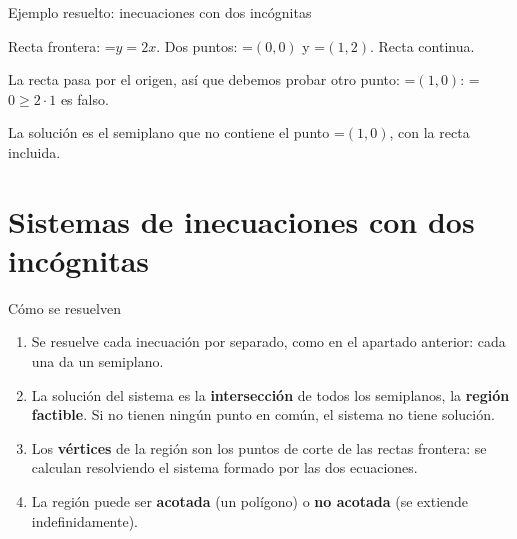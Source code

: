 \documentclass[11pt,a4paper]{article}
\newcommand{\fmm}[1]{\setbox0=\hbox{$#1$}\ifdim\wd0>\linewidth\fmdisp{#1}\else\mbox{\box0}\fi}
\newcommand{\fmdisp}[1]{\[\setbox2=\hbox{$\displaystyle #1$}\ifdim\wd2>\linewidth\resizebox{\linewidth}{!}{\box2}\else\box2\fi\]}
\begin{document}
\begin{fmex}{Ejemplo resuelto: inecuaciones con dos incógnitas}
\begin{enumerate}[label=\textbf{\arabic*.},leftmargin=*]
Recta frontera: \fmm{y=2x}. Dos puntos: \fmm{(0,0)} y \fmm{(1,2)}. Recta continua.

La recta pasa por el origen, así que debemos probar otro punto: \fmm{(1,0)}: \fmm{0\ge2\cdot1} es falso.

La solución es el semiplano que no contiene el punto \fmm{(1,0)}, con la recta incluida.

\begin{center}\end{center}
\end{enumerate}
\end{fmex}

\section{Sistemas de inecuaciones con dos incógnitas}\hypertarget{sec5}{}
\begin{fmprop}{Cómo se resuelven}
\begin{enumerate}
\item Se resuelve cada inecuación por separado, como en el apartado anterior: cada una da un semiplano.
\item La solución del sistema es la \textbf{intersección} de todos los semiplanos, la \textbf{región factible}. Si no tienen ningún punto en común, el sistema no tiene solución.
\item Los \textbf{vértices} de la región son los puntos de corte de las rectas frontera: se calculan resolviendo el sistema formado por las dos ecuaciones.
\item La región puede ser \textbf{acotada} (un polígono) o \textbf{no acotada} (se extiende indefinidamente).
\end{enumerate}
\end{fmprop}
\end{document}

